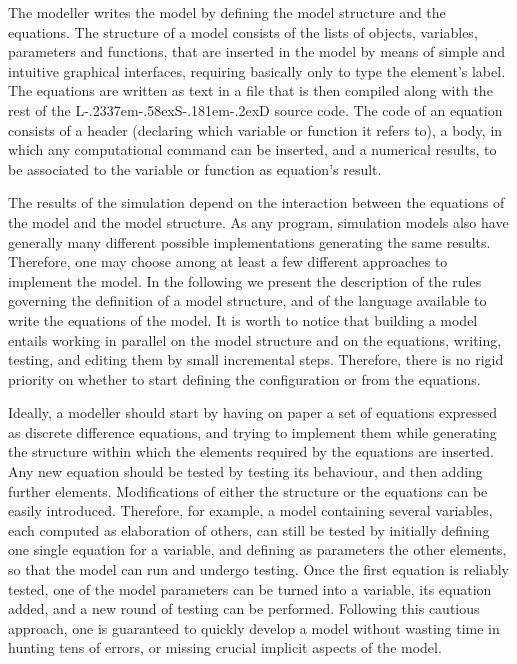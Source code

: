 \documentclass [11pt,a4paper] {book}
\def\LsD{{L\kern-.2337em\lower-.58ex\hbox{S}\kern-.181em\lower-.2ex\hbox{D}}\xspace}
\begin{document}
The modeller writes the model by defining the model structure and the equations. The structure of a model consists of the lists of objects, variables, parameters and functions, that are inserted in the model by means of simple and intuitive graphical interfaces, requiring basically only to type the element's label. The equations are written as text in a file that is then compiled along with the rest of the \LsD source code. The code of an equation consists of a header (declaring which variable or function it refers to), a body, in which any computational command can be inserted, and a numerical results, to be associated to the variable or function as equation's result.


The results of the simulation depend on the interaction between the equations of the model and the model structure. As any program, simulation models also have generally many different possible implementations generating the same results. Therefore, one may choose among at least a few different approaches to implement the model.  In the following we present the description of the rules governing the definition of a model structure, and of the language available to write the equations of the model. It is worth to notice that building a model entails working in parallel on the model structure and on the equations, writing, testing, and editing them by small incremental steps. Therefore, there is no rigid priority on whether to start defining the configuration or from the equations.

Ideally, a modeller should start by having on paper a set of equations expressed as discrete difference equations, and trying to implement them while generating the structure within which the elements required by the equations are inserted. Any new equation should be tested by testing its behaviour, and then adding further elements. Modifications of either the structure or the equations can be easily introduced. Therefore, for example, a model containing several variables, each computed as elaboration of others, can still be tested by initially defining one single equation for a variable, and defining as parameters the other elements, so that the model can run and undergo testing. Once the first equation is reliably tested, one of the model parameters can be turned into a variable, its equation added, and a new round of testing can be performed. Following this cautious approach, one is guaranteed to quickly develop a model without wasting time in hunting tens of errors, or missing crucial implicit aspects of the model.
\end{document}
